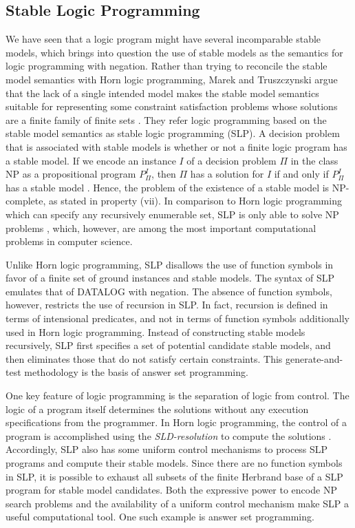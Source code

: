 \subsection{Stable Logic Programming} 
We have seen that a logic program might have several incomparable stable models, 
which brings into question the use of stable models as the semantics for 
logic programming with negation. Rather 
than trying to reconcile the stable model semantics with Horn logic programming, 
Marek and Truszczynski \cite{marek} argue that the lack of a single intended model 
makes the stable model semantics suitable for representing 
some constraint satisfaction problems whose solutions 
are a finite family of finite sets \cite{marek}. 
They refer logic programming based on the stable model semantics  
as stable logic programming (SLP). A decision problem that is associated with 
stable models is whether or not a finite logic program has a stable model. If we 
encode an instance $I$ of a decision problem $\Pi$ in the class NP as a propositional program 
$P ^I _ \Pi$, then $\Pi$ has a solution for $I$ if and only if $P ^I _ \Pi$ 
has a stable model \cite{marek}. Hence, the problem of the existence of a stable model is 
NP-complete, as stated in property (vii). In comparison to Horn logic programming 
which can specify any recursively enumerable set, SLP is only able 
to solve NP problems \cite{marek}, which, however, are among the most important computational 
problems in computer science.

Unlike Horn logic programming, SLP disallows the use of function symbols in favor of 
a finite set of ground instances and stable models. The syntax of SLP emulates 
that of DATALOG with negation. The absence of function symbols, however, restricts the 
use of recursion in SLP. In fact, recursion is defined in terms of intensional predicates, 
and not in terms of function symbols additionally used in Horn logic programming. Instead 
of constructing stable models recursively, SLP first specifies a set of potential candidate 
stable models, and then eliminates those that do not satisfy certain constraints. This 
generate-and-test methodology is the basis of answer set programming. 

One key feature of logic programming is the separation of logic from control. The logic 
of a program itself determines the solutions without any execution specifications from 
the programmer. In Horn logic programming, the control of a program is accomplished 
using the \textit{SLD-resolution} to compute the solutions \cite{marek}. Accordingly, SLP also 
has some uniform control mechanisms to process SLP programs and compute their stable models. 
Since there are no function symbols in SLP, it is possible to exhaust all subsets of the 
finite Herbrand base of a SLP program for stable model candidates. Both the 
expressive power to encode NP search problems and the availability of 
a uniform control mechanism make SLP a useful computational tool. One such example is answer set 
programming.


